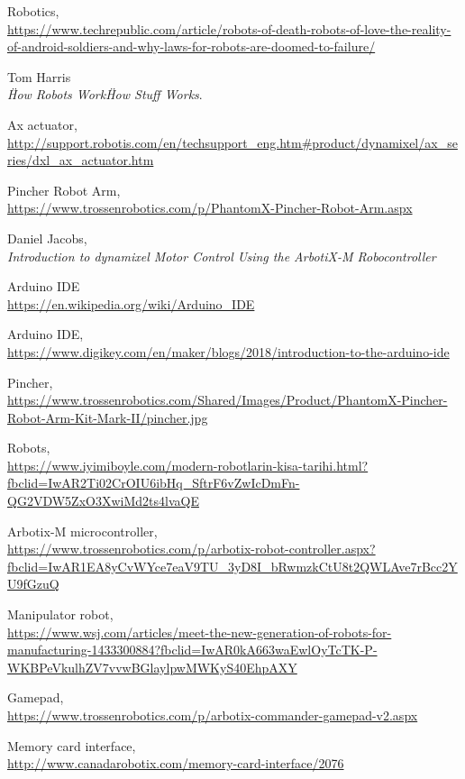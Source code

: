 \begin{thebibliography}{9}

	Robotics,
	\\\url{https://www.techrepublic.com/article/robots-of-death-robots-of-love-the-reality-of-android-soldiers-and-why-laws-for-robots-are-doomed-to-failure/}
	
	Tom Harris\\
	\textit{\"How Robots Work\" How Stuff Works}. 	

	Ax actuator,
	\\\url{http://support.robotis.com/en/techsupport_eng.htm#product/dynamixel/ax_series/dxl_ax_actuator.htm}
	
	Pincher Robot Arm,
	\\\url{https://www.trossenrobotics.com/p/PhantomX-Pincher-Robot-Arm.aspx}
	
	Daniel Jacobs,\\
	\textit{Introduction to dynamixel Motor Control Using the ArbotiX-M Robocontroller}

	Arduino IDE
	\\\url{https://en.wikipedia.org/wiki/Arduino_IDE}
	

	Arduino IDE,
	\\\url{https://www.digikey.com/en/maker/blogs/2018/introduction-to-the-arduino-ide}
	
	Pincher,
	\\\url{https://www.trossenrobotics.com/Shared/Images/Product/PhantomX-Pincher-Robot-Arm-Kit-Mark-II/pincher.jpg}

	Robots,
	\\\url{https://www.iyimiboyle.com/modern-robotlarin-kisa-tarihi.html?fbclid=IwAR2Ti02CrOIU6ibHq_SftrF6vZwIcDmFn-QG2VDW5ZxO3XwiMd2ts4lvaQE}

	Arbotix-M microcontroller,
	\\\url{https://www.trossenrobotics.com/p/arbotix-robot-controller.aspx?fbclid=IwAR1EA8yCvWYce7eaV9TU_3yD8I_bRwmzkCtU8t2QWLAve7rBcc2YU9fGzuQ}

	Manipulator robot,
	\\\url{https://www.wsj.com/articles/meet-the-new-generation-of-robots-for-manufacturing-1433300884?fbclid=IwAR0kA663waEwlOyTcTK-P-WKBPeVkulhZV7vvwBGlaylpwMWKyS40EhpAXY}

	Gamepad,
	\\\url{https://www.trossenrobotics.com/p/arbotix-commander-gamepad-v2.aspx}

	Memory card interface,
	\\\url{http://www.canadarobotix.com/memory-card-interface/2076}

\end{thebibliography}